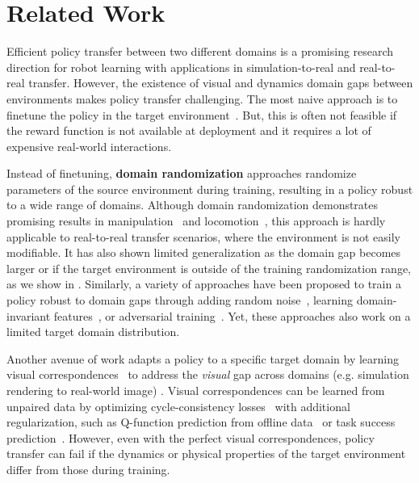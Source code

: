 \section{Related Work}

Efficient policy transfer between two different domains is a promising research direction for robot learning with applications in simulation-to-real and real-to-real transfer. However, the existence of visual and dynamics domain gaps between environments makes policy transfer challenging. The most naive approach is to finetune the policy in the target environment~\citep{rusu2017sim, julian2020finetune}. But, this is often not feasible if the reward function is not available at deployment and it requires a lot of expensive real-world interactions.

Instead of finetuning, \textbf{domain randomization} approaches randomize parameters of the source environment during training, resulting in a policy robust to a wide range of domains. 
Although domain randomization demonstrates promising results in manipulation~\citep{tobin2017domain, james2017transferring, peng2018sim} and locomotion~\citep{peng2020learning}, this approach is hardly applicable to real-to-real transfer scenarios, where the environment is not easily modifiable. It has also shown limited generalization as the domain gap becomes larger or if the target environment is outside of the training randomization range, as we show in .
Similarly, a variety of approaches have been proposed to train a policy robust to domain gaps through adding random noise~\citep{jakobi1995noise}, learning domain-invariant features~\citep{gupta2017learning}, or adversarial training~\citep{ganin2016domain, pinto2017robust, rajeswaran2017epopt}. Yet, these approaches also work on a limited target domain distribution. 

Another avenue of work adapts a policy to a specific target domain by learning visual correspondences~\citep{bousmalis2018using, rao2020rl} to address the \textit{visual} gap across domains (e.g. simulation rendering to real-world image) .
Visual correspondences can be learned from unpaired data by optimizing cycle-consistency losses~\citep{zhu2017unpaired} with additional regularization, such as Q-function prediction from offline data~\citep{rao2020rl} or task success prediction~\citep{bousmalis2018using}.
However, even with the perfect visual correspondences, policy transfer can fail if the dynamics or physical properties of the target environment differ from those during training.

